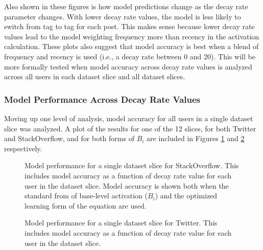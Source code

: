 \documentclass[man,floatsintext,donotrepeattitle]{apa6}
\begin{document}
Also shown in these figures is how model predictions change as the decay rate parameter changes.
With lower decay rate values, the model is less likely to switch from tag to tag for each post.
This makes sense because lower decay rate values lead to the model weighting frequency more than recency in the activation calculation.
These plots also suggest that model accuracy is best when a blend of frequency and recency is used (i.e., a decay rate between 0 and 20).
This will be more formally tested when model accuracy across decay rate values is analyzed across all users in each dataset slice and all dataset slices.

\subsubsection{Model Performance Across Decay Rate Values}

Moving up one level of analysis, model accuracy for all users in a single dataset slice was analyzed.
A plot of the results for one of the 12 slices, for both Twitter and StackOverflow, and for both forms of $B_{i}$ are included in Figures \ref{figPriorSOQSliceDsStd} and \ref{figPriorTwitterSliceDsStd} respectively.

\begin{figure}[!htbp]
  {%
    \setlength{\fboxsep}{0pt}%
    \setlength{\fboxrule}{1pt}%
    \hfill
    \hfill
    \caption{
    Model performance for a single dataset slice for StackOverflow.
    This includes model accuracy as a function of decay rate value for each user in the dataset slice.
    Model accuracy is shown both when the standard from of base-level activation ($B_{i}$) and the optimized learning form of the equation are used. 
  }
    \label{figPriorSOQSliceDsStd}
  }%
\end{figure}

\begin{figure}[!htbp]
  {%
    \setlength{\fboxsep}{0pt}%
    \setlength{\fboxrule}{1pt}%
    \hfill
    \hfill
    \caption{
      Model performance for a single dataset slice for Twitter.
      This includes model accuracy as a function of decay rate value for each user in the dataset slice.
    }
    \label{figPriorTwitterSliceDsStd}
  }%
\end{figure}
\end{document}
